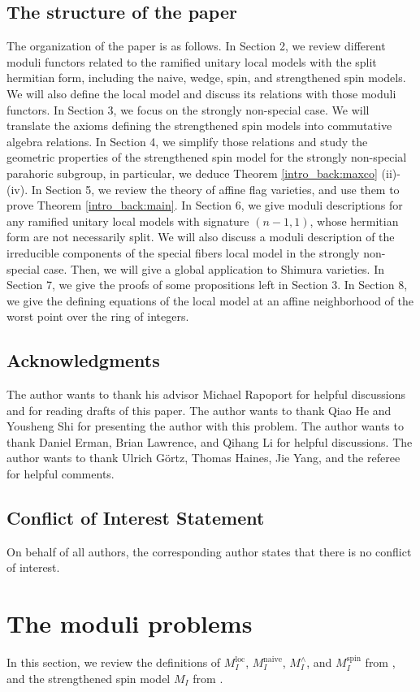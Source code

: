 \documentclass[pdflatex,sn-mathphys-num]{sn-jnl}%
\theoremstyle{thmstyleone}%
\theoremstyle{thmstyletwo}%
\numberwithin{equation}{subsection}
\theoremstyle{thmstylethree}%
\newcommand{\loc}{\ensuremath{\mathrm{loc}}\xspace}
\newcommand{\naive}{\ensuremath{\mathrm{naive}}\xspace}
\newcommand{\spin}{\ensuremath{\mathrm{spin}}\xspace}
\begin{document}
\subsection{The structure of the paper}
The organization of the paper is as follows.
In Section 2, we review different moduli functors related to the ramified unitary local models with the split hermitian form, including the naive, wedge, spin, and strengthened spin models. We will also define the local model and discuss its relations with those moduli functors. 
In Section 3, we focus on the strongly non-special case. We will translate the axioms defining the strengthened spin models into commutative algebra relations.
In Section 4, we simplify those relations and study the geometric properties of the strengthened spin model for the strongly non-special parahoric subgroup, in particular, we deduce Theorem \ref{intro_back:maxco} (ii)-(iv).
In Section 5, we review the theory of affine flag varieties, and use them to prove Theorem \ref{intro_back:main}.
In Section 6, we give moduli descriptions for any ramified unitary local models with signature $(n-1,1)$, whose hermitian form are not necessarily split. We will also discuss a moduli description of the irreducible components of the special fibers local model in the strongly non-special case. Then, we will give a global application to Shimura varieties.
In Section 7, we give the proofs of some propositions left in Section 3.
In Section 8, we give the defining equations of the local model at an affine neighborhood of the worst point over the ring of integers.
		
		
\subsection{Acknowledgments}
The author wants to thank his advisor Michael Rapoport for helpful discussions and for reading drafts of this paper.
The author wants to thank Qiao He and Yousheng Shi for presenting the author with this problem. 
The author wants to thank Daniel Erman, Brian Lawrence, and Qihang Li for helpful discussions. 
The author wants to thank Ulrich G\"ortz, Thomas Haines, Jie Yang, and the referee for helpful comments.
		
\subsection{Conflict of Interest Statement}
On behalf of all authors, the corresponding author states that there is no conflict of interest. 
\section{The moduli problems}\label{moduli}
In this section, we review the definitions of $M_I^\loc$, $M_I^\naive$, $M_I^\wedge$, and $M_I^\spin$ from \cite{PR2009}, and the strengthened spin model $M_I$ from \cite{Smithling2015}.
		
\end{document}
